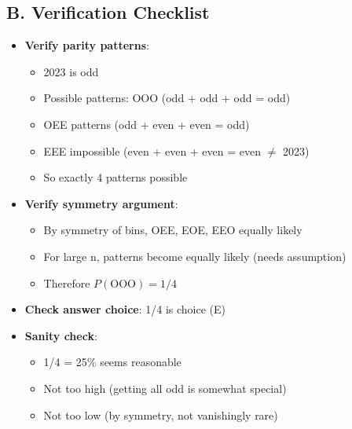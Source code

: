 \documentclass[12pt]{article}
\begin{document}
\begin{verificationbox}
\subsection*{B. Verification Checklist}
\begin{itemize}[leftmargin=*]
    \item \textbf{Verify parity patterns}:
    \begin{itemize}
        \item 2023 is odd \checkmark
        \item Possible patterns: OOO (odd + odd + odd = odd) \checkmark
        \item OEE patterns (odd + even + even = odd) \checkmark
        \item EEE impossible (even + even + even = even $\neq$ 2023) \checkmark
        \item So exactly 4 patterns possible \checkmark
    \end{itemize}
    \item \textbf{Verify symmetry argument}:
    \begin{itemize}
        \item By symmetry of bins, OEE, EOE, EEO equally likely \checkmark
        \item For large n, patterns become equally likely \checkmark (needs assumption)
        \item Therefore $P(\text{OOO}) = 1/4$ \checkmark
    \end{itemize}
    \item \textbf{Check answer choice}: 1/4 is choice (E) \checkmark
    \item \textbf{Sanity check}:
    \begin{itemize}
        \item 1/4 = 25\% seems reasonable
        \item Not too high (getting all odd is somewhat special)
        \item Not too low (by symmetry, not vanishingly rare)
    \end{itemize}
\end{itemize}


\end{verificationbox}
\end{document}
